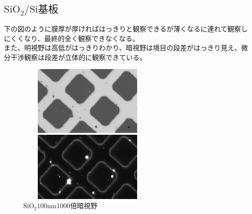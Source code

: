 \documentclass{jsarticle}
\begin{document}
\subsection{$\mathrm{SiO_2/Si}基板$}
下の図のように膜厚が厚ければはっきりと観察できるが薄くなるに連れて観察しにくくなり、最終的全く観察できなくなる。\\
また、明視野は高低がはっきりわかり、暗視野は境目の段差がはっきり見え、微分干渉観察は段差が立体的に観察できている。
\begin{figure}[htbp]
 \begin{minipage}{0.5\hsize}
  \begin{center}
   \includegraphics[width=70mm,height=35mm]{pictures/SiO2_100nm_x1000_BF.bmp}
  \end{center}
  \caption{$\mathrm{SiO_2 100nm 1000倍　明視野}$}
  \label{fig:one}
 \end{minipage}
 \begin{minipage}{0.5\hsize}
  \begin{center}
   \includegraphics[width=70mm,height=35mm]{pictures/SiO2_100nm_x1000_DF.bmp}
  \end{center}
  \caption{$\mathrm{SiO_2 100nm 1000倍　暗視野}$}
  \label{fig:two}
 \end{minipage}
\end{figure}
\end{document}
